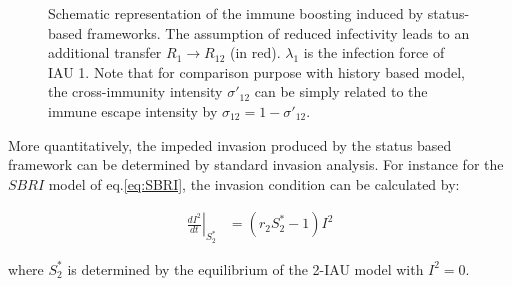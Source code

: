 \begin{center}
\begin{figure}[h!]
\centering
{}
\caption{Schematic representation of the immune boosting induced by
  status-based frameworks. The assumption of reduced infectivity leads
  to an additional transfer $R_{1}\to R_{12}$ (in red). $\lambda_{1}$
  is the infection force of IAU 1. Note that for comparison purpose
  with history based model, the cross-immunity intensity
  $\sigma'_{12}$ can be simply related to the immune escape intensity
  by $\sigma_{12}=1-\sigma'_{12}$.}
\label{SBRI_2}
\end{figure}
\end{center}

\clearpage

More quantitatively, the impeded invasion produced by the status based
framework can be determined by standard invasion analysis. For
instance for the $SBRI$ model of eq.\eqref{eq:SBRI}, the invasion
condition can be calculated by:

\begin{align}
  \left. \frac{d I^2}{d t} \right|_{S_2^*} & =
  (r_2 S_2^* -1) I^2 \label{eq:invasion_sbri}
\end{align}

where $S_2^*$ is determined by the equilibrium of the 2-IAU model with
$I^2=0$.

